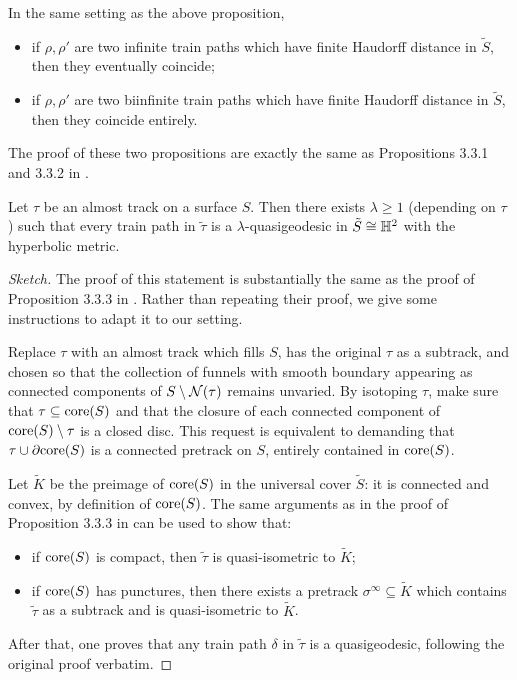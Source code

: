 \begin{prop}
In the same setting as the above proposition,
\begin{itemize}
\item if $\rho, \rho'$ are two infinite train paths which have finite Haudorff distance in $\tilde S$, then they eventually coincide;
\item if $\rho, \rho'$ are two biinfinite train paths which have finite Haudorff distance in $\tilde S$, then they coincide entirely.
\end{itemize}
\end{prop}

The proof of these two propositions are exactly the same as Propositions 3.3.1 and 3.3.2 in \cite{mosher}.

\begin{prop}\label{prp:paths_quasi_geod}
Let $\tau$ be an almost track on a surface $S$. Then there exists $\lambda\geq 1$ (depending on $\tau$) such that every train path in $\tilde\tau$ is a $\lambda$-quasigeodesic in $\tilde S\cong\mathbb H^2$ with the hyperbolic metric.
\end{prop}
\begin{proof}[Sketch]
The proof of this statement is substantially the same as the proof of Proposition 3.3.3 in \cite{mosher}. Rather than repeating their proof, we give some instructions to adapt it to our setting.

Replace $\tau$ with an almost track which fills $S$, has the original $\tau$ as a subtrack, and chosen so that the collection of funnels with smooth boundary appearing as connected components of $S\setminus {\mathcal N}(\tau)$ remains unvaried. By isotoping $\tau$, make sure that $\tau\subseteq \mathrm{core}(S)$ and that the closure of each connected component of $\mathrm{core}(S)\setminus \tau$ is a closed disc. This request is equivalent to demanding that $\tau\cup \partial\mathrm{core}(S)$ is a connected pretrack on $S$, entirely contained in $\mathrm{core}(S)$.

Let $\tilde K$ be the preimage of $\mathrm{core}(S)$ in the universal cover $\tilde S$: it is connected and convex, by definition of $\mathrm{core}(S)$. The same arguments as in the proof of Proposition 3.3.3 in \cite{mosher} can be used to show that:
\begin{itemize}
\item if $\mathrm{core}(S)$ is compact, then $\tilde\tau$ is quasi-isometric to $\tilde K$;
\item if $\mathrm{core}(S)$ has punctures, then there exists a pretrack $\sigma^\infty\subseteq \tilde K$ which contains $\tilde\tau$ as a subtrack and is quasi-isometric to $\tilde K$.
\end{itemize}

After that, one proves that any train path $\delta$ in $\tilde\tau$ is a quasigeodesic, following the original proof verbatim.
\end{proof}

